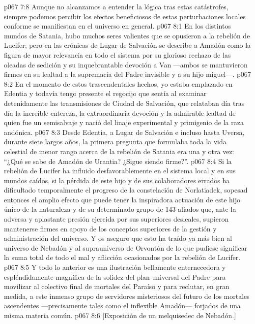 \vs p067 7:8 \pc Aunque no alcanzamos a entender la lógica tras estas catástrofes, siempre podemos percibir los efectos beneficiosos de estas perturbaciones locales conforme se manifiestan en el universo en general.
\vs p067 8:1 En los distintos mundos de Satania, hubo muchos seres valientes que se opusieron a la rebelión de Lucifer; pero en las crónicas de Lugar de Salvación se describe a Amadón como la figura de mayor relevancia en todo el sistema por su glorioso rechazo de las oleadas de sedición y su inquebrantable devoción a Van ---ambos se mantuvieron firmes en su lealtad a la supremacía del Padre invisible y a su hijo miguel---.
\vs p067 8:2 En el momento de estos trascendentales hechos, yo estaba emplazado en Edentia y todavía tengo presente el regocijo que sentía al examinar detenidamente las transmisiones de Ciudad de Salvación, que relataban día tras día la increíble entereza, la extraordinaria devoción y la admirable lealtad de quien fue un semisalvaje y nació del linaje experimental y primigenio de la raza andónica.
\vs p067 8:3 Desde Edentia, a Lugar de Salvación e incluso hasta Uversa, durante siete largos años, la primera pregunta que formulaba toda la vida celestial de menor rango acerca de la rebelión de Satania era una y otra vez: “¿Qué se sabe de Amadón de Urantia? ¿Sigue siendo firme?”.
\vs p067 8:4 Si la rebelión de Lucifer ha influido desfavorablemente en el sistema local y en sus mundos caídos, si la pérdida de este hijo y de sus colaboradores errados ha dificultado temporalmente el progreso de la constelación de Norlatiadek, sopesad entonces el amplio efecto que puede tener la inspiradora actuación de este hijo único de la naturaleza y de su determinado grupo de 143 aliados que, ante la adversa y aplastante presión ejercida por sus superiores desleales, supieron mantenerse firmes en apoyo de los conceptos superiores de la gestión y administración del universo. Y os aseguro que esto ha traído ya más bien al universo de Nebadón y al suprauniverso de Orvontón de lo que pudiese significar la suma total de todo el mal y aflicción ocasionados por la rebelión de Lucifer.
\vs p067 8:5 Y todo lo anterior es una ilustración bellamente enternecedora y espléndidamente magnífica de la solidez del plan universal del Padre para movilizar al colectivo final de mortales del Paraíso y para reclutar, en gran medida, a este inmenso grupo de servidores misteriosos del futuro de los mortales ascendentes ---precisamente tales como el inflexible Amadón--- forjados de una misma materia común.
\vsetoff
\vs p067 8:6 [Exposición de un melquisedec de Nebadón.]
